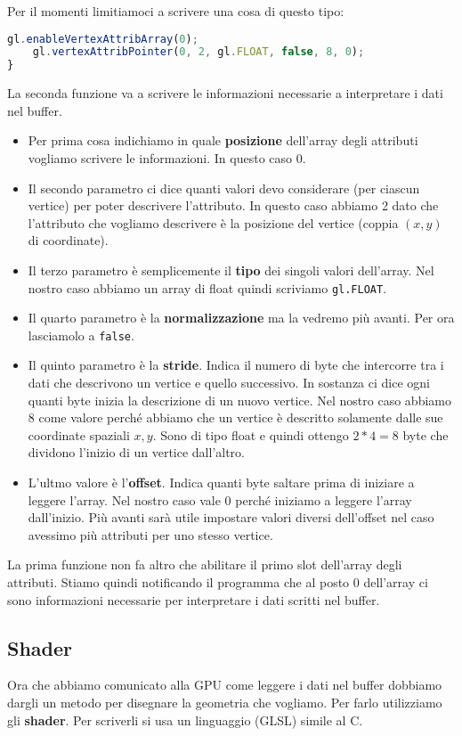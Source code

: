 Per il momenti limitiamoci a scrivere una cosa di questo tipo:
\begin{lstlisting}[language=javascript, firstnumber=10]
	gl.enableVertexAttribArray(0);
	gl.vertexAttribPointer(0, 2, gl.FLOAT, false, 8, 0);
}
\end{lstlisting}
La seconda funzione va a scrivere le informazioni necessarie a interpretare i dati nel
buffer.
\begin{itemize}
	\item Per prima cosa indichiamo in quale \textbf{posizione} dell'array degli attributi
	      vogliamo scrivere le informazioni. In questo caso 0.
	\item Il secondo parametro ci dice quanti valori devo considerare (per ciascun vertice)
	      per poter descrivere l'attributo. In questo caso abbiamo 2 dato che l'attributo
	      che vogliamo descrivere \`e la posizione del vertice (coppia $(x, y)$ di
	      coordinate).
	\item Il terzo parametro \`e semplicemente il \textbf{tipo} dei singoli valori dell'array.
	      Nel nostro caso abbiamo un array di float quindi scriviamo \verb|gl.FLOAT|.
	\item Il quarto parametro \`e la \textbf{normalizzazione} ma la vedremo pi\`u avanti.
	      Per ora lasciamolo a \verb|false|.
	\item Il quinto parametro \`e la \textbf{stride}. Indica il numero di byte che intercorre
	      tra i dati che descrivono un vertice e quello successivo. In sostanza ci dice ogni
	      quanti byte inizia la descrizione di un nuovo vertice. Nel nostro caso abbiamo 8
	      come valore perch\'e abbiamo che un vertice \`e descritto solamente dalle sue
	      coordinate spaziali $x, y$. Sono di tipo float e quindi ottengo $2 * 4 = 8$ byte
	      che dividono l'inizio di un vertice dall'altro.
	\item L'ultmo valore \`e l'\textbf{offset}. Indica quanti byte saltare prima di iniziare
	      a leggere l'array. Nel nostro caso vale 0 perch\'e iniziamo a leggere l'array
	      dall'inizio. Pi\`u avanti sar\`a utile impostare valori diversi dell'offset
	      nel caso avessimo pi\`u attributi per uno stesso vertice.
\end{itemize}
La prima funzione non fa altro che abilitare il primo slot dell'array degli attributi.
Stiamo quindi notificando il programma che al posto 0 dell'array ci sono informazioni
necessarie per interpretare i dati scritti nel buffer.

\subsection{Shader}
Ora che abbiamo comunicato alla GPU come leggere i dati nel buffer dobbiamo dargli un
metodo per disegnare la geometria che vogliamo. Per farlo utilizziamo gli \textbf{shader}.
Per scriverli si usa un linguaggio (GLSL) simile al C.

